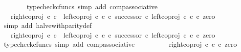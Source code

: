 \begin{isabellebody}
\ \ \ \ \ \ \isamarkupfalse%
\ {\isacharparenleft}{\kern0pt}typecheck{\isacharunderscore}{\kern0pt}cfuncs{\isacharcomma}{\kern0pt}\ simp\ add{\isacharcolon}{\kern0pt}\ comp{\isacharunderscore}{\kern0pt}associative{}{\isacharparenright}{\kern0pt}\isanewline
\ \ \ \ \isamarkupfalse%
\ \isamarkupfalse%
\ {\isachardoublequoteopen}{\isachardot}{\kern0pt}{\isachardot}{\kern0pt}{\isachardot}{\kern0pt}\ {\isacharequal}{\kern0pt}\ right{\isacharunderscore}{\kern0pt}coproj\ {\isasymnat}\isactrlsub c\ {\isasymnat}\isactrlsub c\ {\isasymamalg}\ {\isacharparenleft}{\kern0pt}left{\isacharunderscore}{\kern0pt}coproj\ {\isasymnat}\isactrlsub c\ {\isasymnat}\isactrlsub c\ {\isasymcirc}\isactrlsub c\ successor{\isacharparenright}{\kern0pt}\ {\isasymcirc}\isactrlsub c\ left{\isacharunderscore}{\kern0pt}coproj\ {\isasymnat}\isactrlsub c\ {\isasymnat}\isactrlsub c\ {\isasymcirc}\isactrlsub c\ zero{\isachardoublequoteclose}\isanewline
\ \ \ \ \ \ \isamarkupfalse%
\ {\isacharparenleft}{\kern0pt}simp\ add{\isacharcolon}{\kern0pt}\ halve{\isacharunderscore}{\kern0pt}with{\isacharunderscore}{\kern0pt}parity{\isacharunderscore}{\kern0pt}def{}{\isacharparenright}{\kern0pt}\isanewline
\ \ \ \ \isamarkupfalse%
\ \isamarkupfalse%
\ {\isachardoublequoteopen}{\isachardot}{\kern0pt}{\isachardot}{\kern0pt}{\isachardot}{\kern0pt}\ {\isacharequal}{\kern0pt}\ {\isacharparenleft}{\kern0pt}right{\isacharunderscore}{\kern0pt}coproj\ {\isasymnat}\isactrlsub c\ {\isasymnat}\isactrlsub c\ {\isasymamalg}\ {\isacharparenleft}{\kern0pt}left{\isacharunderscore}{\kern0pt}coproj\ {\isasymnat}\isactrlsub c\ {\isasymnat}\isactrlsub c\ {\isasymcirc}\isactrlsub c\ successor{\isacharparenright}{\kern0pt}\ {\isasymcirc}\isactrlsub c\ left{\isacharunderscore}{\kern0pt}coproj\ {\isasymnat}\isactrlsub c\ {\isasymnat}\isactrlsub c{\isacharparenright}{\kern0pt}\ {\isasymcirc}\isactrlsub c\ zero{\isachardoublequoteclose}\isanewline
\ \ \ \ \ \ \isamarkupfalse%
\ {\isacharparenleft}{\kern0pt}typecheck{\isacharunderscore}{\kern0pt}cfuncs{\isacharcomma}{\kern0pt}\ simp\ add{\isacharcolon}{\kern0pt}\ comp{\isacharunderscore}{\kern0pt}associative{}{\isacharparenright}{\kern0pt}\isanewline
\ \ \ \ \isamarkupfalse%
\ \isamarkupfalse%
\ {\isachardoublequoteopen}{\isachardot}{\kern0pt}{\isachardot}{\kern0pt}{\isachardot}{\kern0pt}\ {\isacharequal}{\kern0pt}\ right{\isacharunderscore}{\kern0pt}coproj\ {\isasymnat}\isactrlsub c\ {\isasymnat}\isactrlsub c\ {\isasymcirc}\isactrlsub c\ zero{\isachardoublequoteclose}\isanewline

\end{isabellebody}
